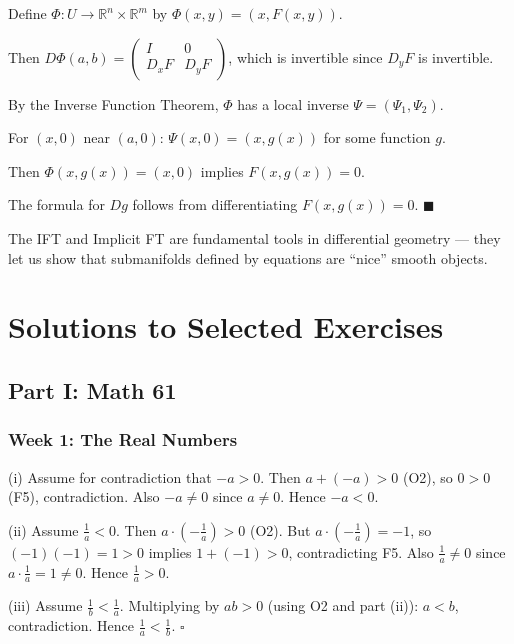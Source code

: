 \documentclass[11pt, letterpaper, openany]{book}
\renewenvironment{proof}[1][\proofname]{%
  \tcolorbox[blanker, breakable, left=1em,
    before skip=1em, after skip=1em,
    borderline west={2pt}{0pt}{MagicTeal!50},
    colback=MagicCream,
    before upper={\textcolor{MagicTeal}{\sffamily\bfseries #1.}\space}
  ]%
}{%
  \hfill\textcolor{MagicTeal}{\ensuremath{\blacksquare}}\endtcolorbox%
}
\newenvironment{solution}[1][Solution]{%
  \tcolorbox[blanker, breakable, left=1em,
    before skip=1em, after skip=1em,
    borderline west={2pt}{0pt}{MagicBlue},
    colback=MagicCream,
    before upper={\textcolor{MagicBlue}{\sffamily\bfseries #1.}\space}
  ]%
}{%
  \hfill\textcolor{MagicBlue}{\ensuremath{\square}}\endtcolorbox%
}
\begin{document}
\begin{proof}[Sketch]
Define $\Phi: U \to \mathbb{R}^n \times \mathbb{R}^m$ by $\Phi(x, y) = (x, F(x, y))$.

Then $D\Phi(a, b) = \begin{pmatrix} I & 0 \\ D_x F & D_y F \end{pmatrix}$, which is invertible since $D_y F$ is invertible.

By the Inverse Function Theorem, $\Phi$ has a local inverse $\Psi = (\Psi_1, \Psi_2)$.

For $(x, 0)$ near $(a, 0)$: $\Psi(x, 0) = (x, g(x))$ for some function $g$.

Then $\Phi(x, g(x)) = (x, 0)$ implies $F(x, g(x)) = 0$.

The formula for $Dg$ follows from differentiating $F(x, g(x)) = 0$.
\end{proof}

\begin{remark}
The IFT and Implicit FT are fundamental tools in differential geometry --- they let us show that submanifolds defined by equations are ``nice'' smooth objects.
\end{remark}


\backmatter 

\chapter{Solutions to Selected Exercises}

\section*{Part I: Math 61}

\subsection*{Week 1: The Real Numbers}

\begin{solution}[1.1]
(i) Assume for contradiction that $-a > 0$. Then $a + (-a) > 0$ (O2), so $0 > 0$ (F5), contradiction. Also $-a \neq 0$ since $a \neq 0$. Hence $-a < 0$.

(ii) Assume $\frac{1}{a} < 0$. Then $a \cdot (-\frac{1}{a}) > 0$ (O2). But $a \cdot (-\frac{1}{a}) = -1$, so $(-1)(-1) = 1 > 0$ implies $1 + (-1) > 0$, contradicting F5. Also $\frac{1}{a} \neq 0$ since $a \cdot \frac{1}{a} = 1 \neq 0$. Hence $\frac{1}{a} > 0$.

(iii) Assume $\frac{1}{b} < \frac{1}{a}$. Multiplying by $ab > 0$ (using O2 and part (ii)): $a < b$, contradiction. Hence $\frac{1}{a} < \frac{1}{b}$.
\end{solution}
\end{document}
